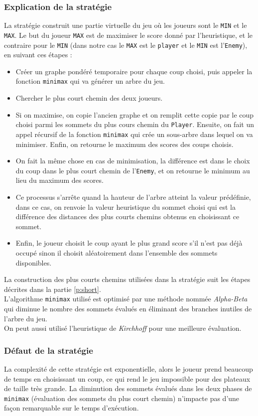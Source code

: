 \documentclass[a4paper, 12pt]{article}
\begin{document}
\subsubsection{Explication de la stratégie}
La stratégie construit une partie virtuelle du jeu où les joueurs sont le \texttt{MIN} et le \texttt{MAX}. Le but du joueur \texttt{MAX} est de maximiser le score donné par l'heuristique, et le contraire pour le \texttt{MIN} (dans notre cas le \texttt{MAX} est le \texttt{player} et le \texttt{MIN} est l'\texttt{Enemy}), en suivant ces étapes :
\begin{itemize}
\item Créer un graphe pondéré temporaire pour chaque coup choisi, puis appeler la fonction \texttt{minimax} qui va générer un arbre du jeu.
\item Chercher le plus court chemin des deux joueurs.
\item Si on maximise, on copie l'ancien graphe et on remplit cette copie par le coup choisi parmi les sommets du plus cours chemin du \texttt{Player}. Ensuite, on fait un appel récursif de la fonction \texttt{minimax} qui crée un sous-arbre dans lequel on va minimiser. Enfin, on retourne le maximum des scores des coups choisis.
\item On fait la même chose en cas de minimisation, la différence est dans le choix du coup dans le plus court chemin de l'\texttt{Enemy}, et on retourne le minimum au lieu du maximum des scores.
\item Ce processus s'arrête quand la hauteur de l'arbre atteint la valeur prédéfinie, dans ce cas, on renvoie la valeur heuristique du sommet choisi qui est la différence des distances des plus courts chemins obtenus en choisissant ce sommet.
\item Enfin, le joueur choisit le coup ayant le plus grand score s'il n'est pas déjà occupé sinon il choisit aléatoirement dans l'ensemble des sommets disponibles.
\end{itemize}
La construction des plus courts chemins utilisées dans la stratégie suit les étapes décrites dans la partie \ref{p:short}.\\
L'algorithme \texttt{minimax} utilisé est optimisé par une méthode nommée \emph{Alpha-Beta} qui diminue le nombre des sommets évalués en éliminant des branches inutiles de l'arbre du jeu.\\
On peut aussi utilisé l'heuristique de \emph{Kirchhoff} pour une meilleure évaluation.\\

\subsubsection{Défaut de la stratégie}
La complexité de cette stratégie est exponentielle, alors le joueur prend beaucoup de temps en choisissant un coup, ce qui rend le jeu impossible pour des plateaux de taille très grande. La diminution des sommets évalués dans les deux phases de \texttt{minimax} (évaluation des sommets du plus court chemin) n'impacte pas d'une façon remarquable sur le temps d'exécution.\\
\end{document}
